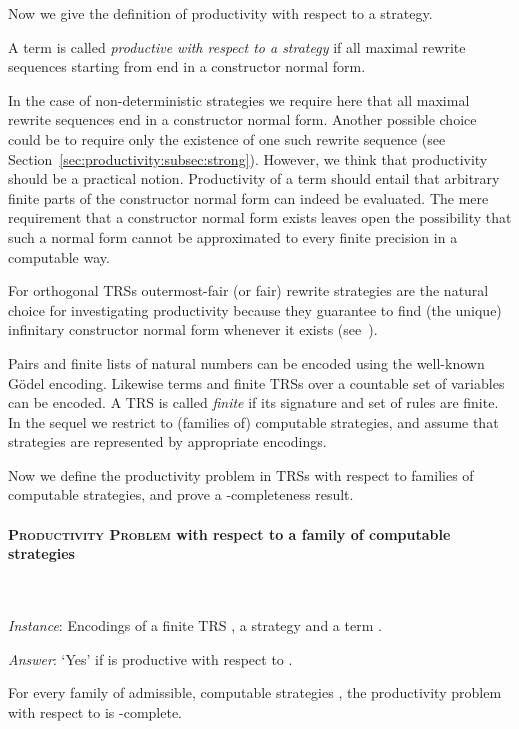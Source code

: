 Now we give the definition of productivity with respect to a strategy.
\begin{definition}\normalfont\label{def:productivity}
  A term  is called \emph{productive with respect to a strategy }
  if all maximal  rewrite sequences starting from  end in a constructor normal form.
\end{definition}
In the case of non-deterministic strategies we require here that all maximal rewrite sequences end in a constructor normal form.
Another possible choice could be to require only the existence of 
one such rewrite sequence (see Section~\ref{sec:productivity:subsec:strong}).
However, we think that productivity should be a practical notion.
Productivity of a term should entail that arbitrary finite parts of the constructor normal form can indeed be evaluated.
The mere requirement that a constructor normal form exists
leaves open the possibility that such a normal form 
cannot be approximated to every finite precision in a computable way.

For orthogonal TRSs outermost-fair (or fair) rewrite strategies
are the natural choice for investigating productivity
because
they guarantee to find (the unique) infinitary constructor normal form whenever it exists (see~\cite{terese:2003}).

Pairs and finite lists of natural numbers can be encoded using the well-known G\"{o}del encoding.
Likewise terms and finite TRSs over a countable set of variables
can be encoded.
A TRS is called \emph{finite} if its signature and set of rules
are finite.
In the sequel we restrict to (families of) computable strategies,
and assume that strategies are represented by
appropriate encodings.

Now we define the productivity problem in TRSs with respect to families
of computable strategies, and prove a -completeness result.


\paragraph{\textsc{Productivity Problem} \normalfont 
  with respect to a family  of computable strategies}\ 

\emph{Instance}:
  Encodings of a finite TRS , 
  a strategy  
  and a term .

\emph{Answer}:
  `Yes' if  is productive with respect to . 

\begin{theorem}\label{thm:strategy}
  For every family of admissible, computable strategies ,
  the productivity problem with respect to  
  is -complete.
\end{theorem}

